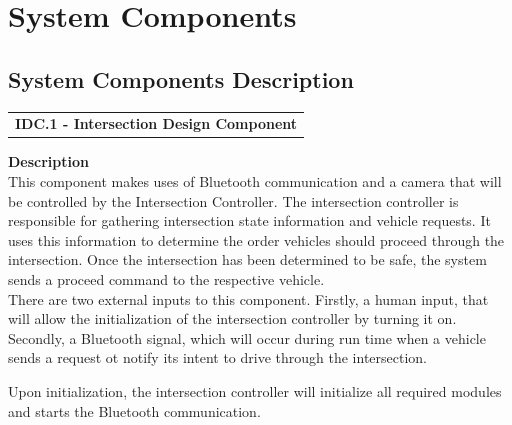 \documentclass [10pt]{article}
\begin{document}





\section{System Components}
 


\subsection{System Components Description}

\begin{longtable}{p{}}
\rowcolor{tableCell}\textbf{IDC.1 - Intersection Design Component} \\
\end{longtable}

\textbf{Description} \\
This component makes uses of Bluetooth communication and a camera that will be controlled by the Intersection Controller. The intersection controller is responsible for gathering intersection state information and vehicle requests. It uses this information to determine the order vehicles should proceed through the intersection.
Once the intersection has been determined to be safe, the system sends a proceed command to the respective vehicle. \\

There are two external inputs to this component. Firstly, a human input, that will allow the initialization of the intersection controller by turning it on. Secondly, a Bluetooth signal, which will occur during run time when a vehicle sends a request ot notify its intent to drive through the intersection.



Upon initialization, the intersection controller will initialize all required modules and  starts the Bluetooth communication.\\
\end{document}
